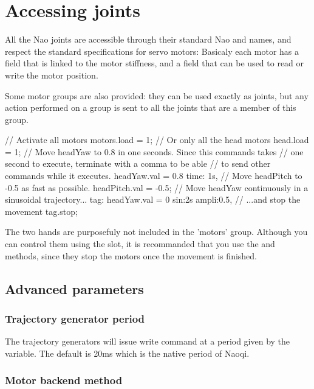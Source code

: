 \section{Accessing joints}
All the Nao joints are accessible through their standard Nao and \urbi names,
and respect the \urbi standard specifications for servo motors: Basicaly each
motor has a  field that is linked to the motor stiffness, and a
 field that can be used to read or write the motor position.

Some motor groups are also provided: they can be used exactly as joints,
but any action performed on a group is sent to all the joints that are a
member of this group.

\begin{urbifixme}
// Activate all motors
motors.load = 1;
// Or only all the head motors
head.load = 1;
// Move headYaw to 0.8 in one seconds. Since this commands takes
// one second to execute, terminate with a comma to be able
// to send other commands while it executes.
headYaw.val = 0.8 time: 1s,
// Move headPitch to -0.5 as fast as possible.
headPitch.val = -0.5;
// Move headYaw continuously in a sinusoidal trajectory...
tag: headYaw.val = 0 sin:2s ampli:0.5,
// ...and stop the movement
tag.stop;
\end{urbifixme}

The two hands are purposefuly not included in the 'motors' group.
Although you can control them using the  slot, it is recommanded that
you use the  and  methods, since they stop the motors
once the movement is finished.

\subsection{Advanced parameters}

\subsubsection{Trajectory generator period}

The trajectory generators will issue write command at a period given by the
 variable. The default is 20ms which is the native period
of Naoqi.

\subsubsection{Motor backend method}


